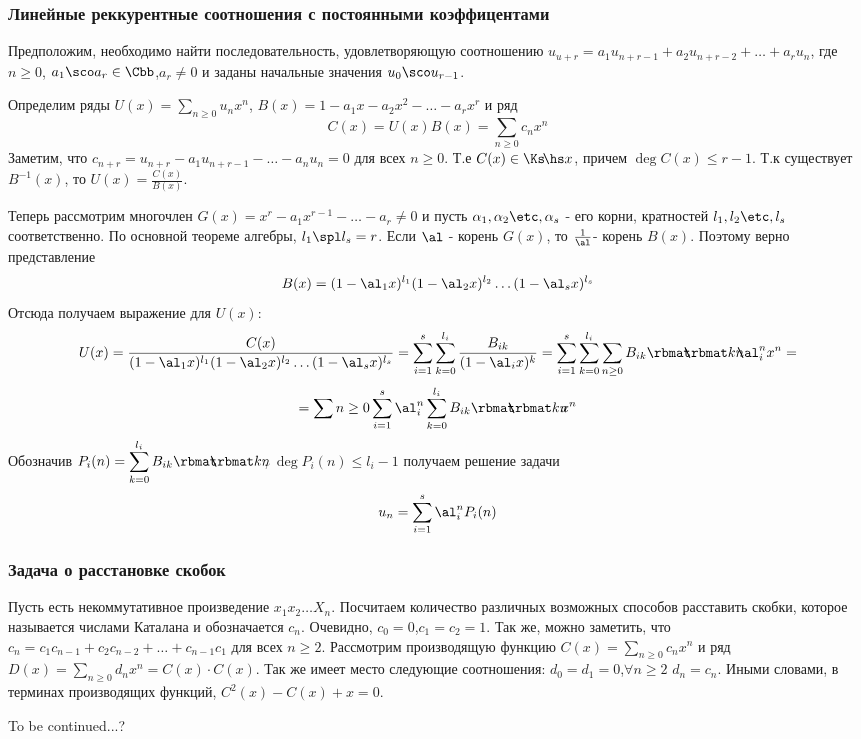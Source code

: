 \documentclass[unicode,10pt]{article}
\begin{document}
\subsubsection{Линейные реккурентные соотношения с постоянными коэффицентами}
Предположим, необходимо найти последовательность, удовлетворяющую соотношению
$u_{u+r}=a_1u_{n+r-1}+a_2u_{n+r-2}+\dots+a_ru_n$, где $n\ge 0$, $a_1\sco a_r\in\Cbb$,$a_r\neq 0$
и заданы начальные значения $u_0\sco u_{r-1}$.

Определим ряды $\displaystyle U(x)=\sum_{n\ge0}u_nx^n$, $B(x)=1-a_1x-a_2x^2-\dots-a_rx^r$ и ряд
\begin{displaymath}
  \displaystyle C(x)=U(x)B(x)=\sum_{n\ge0}c_nx^n
\end{displaymath}
Заметим, что $c_{n+r}=u_{n+r}-a_1u_{n+r-1}-\dots-a_nu_n=0$ для всех $n\ge0$. Т.е $C(x)\in\Ksm$, причем
$\deg C(x)\le r-1$. Т.к существует $B^{-1}(x)$, то $U(x)=\frac{C(x)}{B(x)}$.

Теперь рассмотрим многочлен $G(x)=x^r-a_1x^{r-1}-\dots-a_r\neq0$ и пусть
$\set{s}$ - его корни, кратностей $\set[l]{s}$ соответственно. По основной теореме алгебры, $l_1\spl l_s=r$. Если
$\al$  - корень $G(x)$, то $\inv{\al}$- корень $B(x)$. Поэтому верно представление
\begin{displaymath}
  B(x)=(1-\al_1x)^{l_1}(1-\al_2x)^{l_2}\dots(1-\al_sx)^{l_s}
\end{displaymath}
Отсюда получаем выражение для $U(x)$:
\begin{displaymath}
  U(x)=\frac{C(x)}{(1-\al_1x)^{l_1}(1-\al_2x)^{l_2}\dots(1-\al_sx)^{l_s}}=\sum_{i=1}^s\sum_{k=0}^{l_i}\frac{B_{ik}}{(1-\al_ix)^k}=\sumind{i}{1}{s}\sumind{k}{0}{l_i}\sum_{n\ge0}B_{ik}\cnka{k}{n}\al_i^nx^n=
\end{displaymath}
\begin{displaymath}
  =\sum{n\ge0}\sumind{i}{1}{s}\al_i^n\sumind{k}{0}{l_i}B_{ik}\cnka{k}{n}x^n
\end{displaymath}
Обозначив $\displaystyle P_i(n)=\sumind{k}{0}{l_i}B_{ik}\cnka{k}{n}$, $\deg P_i(n)\le l_i-1$ получаем решение
задачи
\begin{displaymath}
  \displaystyle u_n=\sumind{i}{1}{s}\al_i^nP_i(n)
\end{displaymath}
\subsubsection{Задача о расстановке скобок}
Пусть есть некоммутативное произведение $x_1x_2\dots X_n$. Посчитаем количество различных возможных
способов расставить скобки, которое называется числами Каталана и обозначается $c_n$. Очевидно,
$c_0=0$,$c_1=c_2=1$. Так же, можно заметить, что $c_n=c_1c_{n-1}+c_2c_{n-2}+\dots+c_{n-1}c_1$ для всех
$n\ge2$.
Рассмотрим производящую функцию $\displaystyle C(x)=\sum_{n\ge0}c_nx^n$ и ряд
$\displaystyle D(x)=\sum_{n\ge0}d_nx^n=C(x)\cdot C(x)$.
Так же имеет место следующие соотношения: $d_0=d_1=0$,$\forall n\ge2$ $d_n=c_n$. Иными словами,
в терминах производящих функций, $C^2(x)-C(x)+x=0$.
\begin{authornote}
  To be continued...?
\end{authornote}
\end{document}
